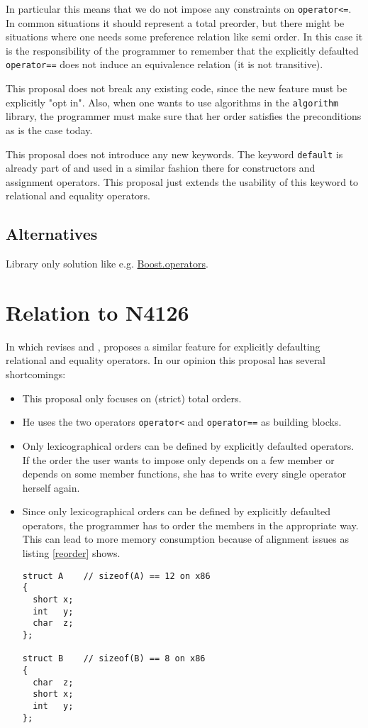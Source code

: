 ﻿\documentclass[a4paper,11pt,final]{article}
\newcommand{\tcode}[1]{\lstinline[basicstyle=\normalsize\ttfamily]{#1}}
\numberwithin{equation}{subsection}
\begin{document}
In particular this means that we do not impose any constraints on \tcode{operator<=}. In common situations it should represent a total preorder, but there might be situations where one needs some preference relation like semi order. In this case it is the responsibility of the programmer to remember that the explicitly defaulted \tcode{operator==} does not induce an equivalence relation (it is not transitive).\par

This proposal does not break any existing code, since the new feature must be explicitly "opt in". Also, when one wants to use algorithms in the \verb|algorithm| library, the programmer must make sure that her order satisfies the preconditions as is the case today.\par

This proposal does not introduce any new keywords. The keyword \tcode{default} is already part of  and used in a similar fashion there for constructors and assignment operators. This proposal just extends the usability of this keyword to relational and equality operators.

\subsection{Alternatives}
Library only solution like e.g. \href{http://www.boost.org/doc/libs/1_56_0/libs/utility/operators.htm}{Boost.operators}.

\section{Relation to N4126}
In  which revises  and , \citeauthor{oleg3} proposes a similar feature for explicitly defaulting relational and equality operators. In our opinion this proposal has several shortcomings:

\begin{itemize}
\item This proposal only focuses on (strict) total orders.
\item He uses the two operators \tcode{operator<} and \tcode{operator==} as building blocks.
\item Only lexicographical orders can be defined by explicitly defaulted operators. If the order the user wants to impose only depends on a few member or depends on some member functions, she has to write every single operator herself again.
\item Since only lexicographical orders can be defined by explicitly defaulted operators, the programmer has to order the members in the appropriate way. This can lead to more memory consumption because of alignment issues as listing \ref{reorder} shows.
\begin{lstlisting}[caption=Different order of members leads to different size in memory,label=reorder]
struct A    // sizeof(A) == 12 on x86 
{
  short x;
  int   y;
  char  z;
};

struct B    // sizeof(B) == 8 on x86
{
  char  z;
  short x;
  int   y; 
};
\end{lstlisting}

\end{itemize}
\end{document}
